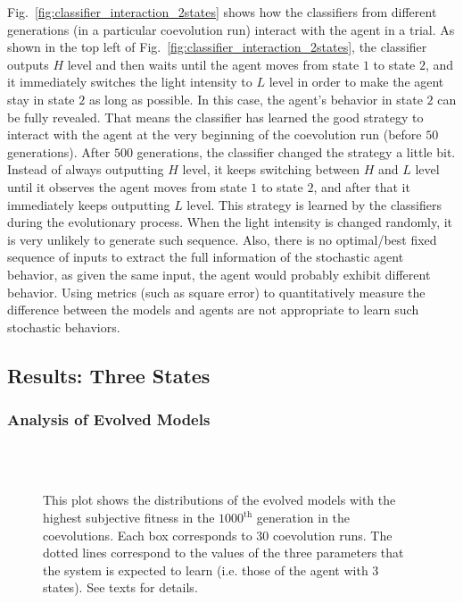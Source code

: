 Fig.~\ref{fig:classifier_interaction_2states} shows how the classifiers from different generations (in a particular coevolution run) interact with the agent in a trial. As shown in the top left of Fig.~\ref{fig:classifier_interaction_2states}, the classifier outputs $H$ level and then waits until the agent moves from state $1$ to state $2$, and it immediately switches the light intensity to $L$ level in order to make the agent stay in state $2$ as long as possible. In this case, the agent's behavior in state $2$ can be fully revealed. That means the classifier has learned the good strategy to interact with the agent at the very beginning of the coevolution run (before $50$ generations). After $500$ generations, the classifier changed the strategy a little bit. Instead of always outputting $H$ level, it keeps switching between $H$ and $L$ level until it observes the agent moves from state $1$ to state $2$, and after that it immediately keeps outputting $L$ level. This strategy is learned by the classifiers during the evolutionary process. When the light intensity is changed randomly, it is very unlikely to generate such sequence. Also, there is no optimal/best fixed sequence of inputs to extract the full information of the stochastic agent behavior, as given the same input, the agent would probably exhibit different behavior. Using metrics (such as square error) to quantitatively measure the difference between the models and agents are not appropriate to learn such stochastic behaviors.

\subsection{Results: Three States}\label{sec:results_interaction_stochastic_3states}

\subsubsection{Analysis of Evolved Models}
\begin{figure}[!t]%
	\centering
		\\
		\\
		\caption{This plot shows the distributions of the evolved models with the highest subjective fitness in the $1000^\textrm{th}$ generation in the coevolutions. Each box corresponds to $30$ coevolution runs. The dotted lines correspond to the values of the three parameters that the system is expected to learn (i.e. those of the agent with 3 states). See texts for details.\label{fig:parameters_box_stochastic_three_states}}
\end{figure}

